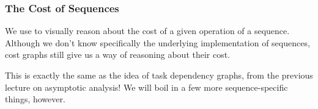 \documentclass[aspectratio=169]{beamer}
\begin{document}

\begin{frame}[fragile]
  \frametitle{The Cost of Sequences}

  We use  to visually reason about the cost of a given
  operation of a sequence. Although we don't know specifically the underlying
  implementation of sequences, cost graphs still give us a way of reasoning
  about their cost.

  \pause
  \vspace{\fill}


  \pause
  \vspace{\fill}

  This is exactly the same as the idea of task dependency graphs, from
  the previous lecture on asymptotic analysis! We will boil in a few more
  sequence-specific things, however.
\end{frame}
\end{document}
